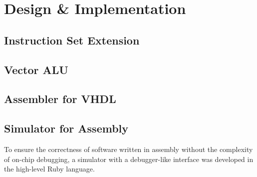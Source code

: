 \section{Design \& Implementation}
\subsection{Instruction Set Extension}
\subsection{Vector ALU}
\subsection{Assembler for VHDL}
\subsection{Simulator for Assembly}
To ensure the correctness of software written in assembly without the
complexity of on-chip debugging, a simulator with a debugger-like interface was
developed in the high-level Ruby language.
